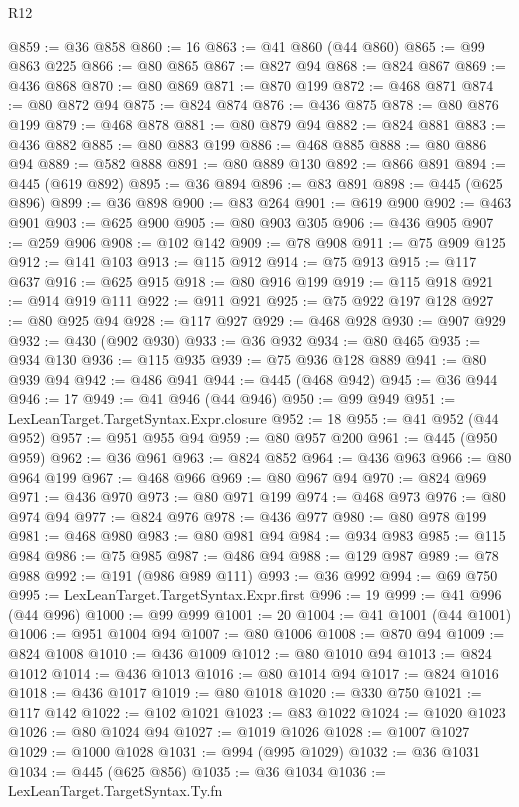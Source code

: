 \begin{lexlean}{R12}
\begin{coremodule}
@859 := @36 @858
@860 := 16
@863 := @41 @860 (@44 @860)
@865 := @99 @863 @225
@866 := @80 @865
@867 := @827 @94
@868 := @824 @867
@869 := @436 @868
@870 := @80 @869
@871 := @870 @199
@872 := @468 @871
@874 := @80 @872 @94
@875 := @824 @874
@876 := @436 @875
@878 := @80 @876 @199
@879 := @468 @878
@881 := @80 @879 @94
@882 := @824 @881
@883 := @436 @882
@885 := @80 @883 @199
@886 := @468 @885
@888 := @80 @886 @94
@889 := @582 @888
@891 := @80 @889 @130
@892 := @866 @891
@894 := @445 (@619 @892)
@895 := @36 @894
@896 := @83 @891
@898 := @445 (@625 @896)
@899 := @36 @898
@900 := @83 @264
@901 := @619 @900
@902 := @463 @901
@903 := @625 @900
@905 := @80 @903 @305
@906 := @436 @905
@907 := @259 @906
@908 := @102 @142
@909 := @78 @908
@911 := @75 @909 @125
@912 := @141 @103
@913 := @115 @912
@914 := @75 @913
@915 := @117 @637
@916 := @625 @915
@918 := @80 @916 @199
@919 := @115 @918
@921 := @914 @919 @111
@922 := @911 @921
@925 := @75 @922 @197 @128
@927 := @80 @925 @94
@928 := @117 @927
@929 := @468 @928
@930 := @907 @929
@932 := @430 (@902 @930)
@933 := @36 @932
@934 := @80 @465
@935 := @934 @130
@936 := @115 @935
@939 := @75 @936 @128 @889
@941 := @80 @939 @94
@942 := @486 @941
@944 := @445 (@468 @942)
@945 := @36 @944
@946 := 17
@949 := @41 @946 (@44 @946)
@950 := @99 @949
@951 := LexLeanTarget.TargetSyntax.Expr.closure
@952 := 18
@955 := @41 @952 (@44 @952)
@957 := @951 @955 @94
@959 := @80 @957 @200
@961 := @445 (@950 @959)
@962 := @36 @961
@963 := @824 @852
@964 := @436 @963
@966 := @80 @964 @199
@967 := @468 @966
@969 := @80 @967 @94
@970 := @824 @969
@971 := @436 @970
@973 := @80 @971 @199
@974 := @468 @973
@976 := @80 @974 @94
@977 := @824 @976
@978 := @436 @977
@980 := @80 @978 @199
@981 := @468 @980
@983 := @80 @981 @94
@984 := @934 @983
@985 := @115 @984
@986 := @75 @985
@987 := @486 @94
@988 := @129 @987
@989 := @78 @988
@992 := @191 (@986 @989 @111)
@993 := @36 @992
@994 := @69 @750
@995 := LexLeanTarget.TargetSyntax.Expr.first
@996 := 19
@999 := @41 @996 (@44 @996)
@1000 := @99 @999
@1001 := 20
@1004 := @41 @1001 (@44 @1001)
@1006 := @951 @1004 @94
@1007 := @80 @1006
@1008 := @870 @94
@1009 := @824 @1008
@1010 := @436 @1009
@1012 := @80 @1010 @94
@1013 := @824 @1012
@1014 := @436 @1013
@1016 := @80 @1014 @94
@1017 := @824 @1016
@1018 := @436 @1017
@1019 := @80 @1018
@1020 := @330 @750
@1021 := @117 @142
@1022 := @102 @1021
@1023 := @83 @1022
@1024 := @1020 @1023
@1026 := @80 @1024 @94
@1027 := @1019 @1026
@1028 := @1007 @1027
@1029 := @1000 @1028
@1031 := @994 (@995 @1029)
@1032 := @36 @1031
@1034 := @445 (@625 @856)
@1035 := @36 @1034
@1036 := LexLeanTarget.TargetSyntax.Ty.fn

\end{coremodule}
\end{lexlean}
